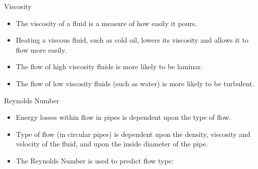 \documentclass[9pt,xcolor={svgnames, x11names},professionalfonts]{beamer}
\begin{document}

\begin{frame}{Viscosity}
	\begin{itemize}
		\item The viscosity of a fluid is a measure of how easily it pours. \parb
		\item Heating a viscous fluid, such as cold oil, lowers its viscosity and allows it to flow more easily. \parb
		\item The flow of high viscosity fluids is more likely to be laminar. \parb
		\item The flow of low viscosity fluids (such as water) is more likely to be turbulent.
	\end{itemize}
	
\end{frame}

\begin{frame}{Reynolds Number}
	\begin{itemize}
		\item Energy losses within flow in pipes is dependent upon the type of flow.
		\item Type of flow (in circular pipes) is dependent upon the density, viscosity and velocity of the fluid, and upon
		      the inside diameter of the pipe.
		\item The Reynolds Number is used to predict flow type:
	\end{itemize}
	
	
\end{frame}
\end{document}
